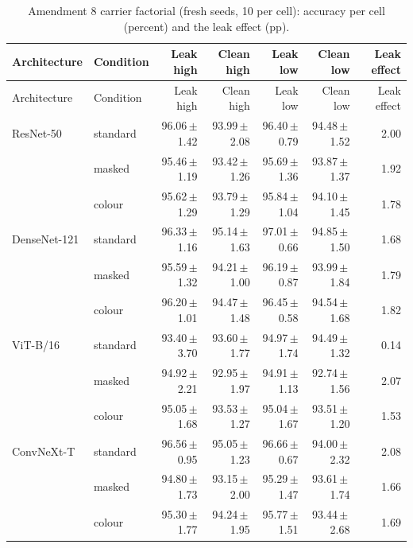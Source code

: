 {\scriptsize
\setlength{\tabcolsep}{3.5pt}
\begin{longtable}{llrrrrr}
\caption{Amendment 8 carrier factorial (fresh seeds, 10 per cell): accuracy per cell (percent) and the leak effect (pp).}\label{r:tab:carrier}\\
\toprule
Architecture & Condition & Leak high & Clean high & Leak low & Clean low & Leak effect \\
\midrule
\endfirsthead
\toprule
Architecture & Condition & Leak high & Clean high & Leak low & Clean low & Leak effect \\
\midrule
\endhead
\bottomrule
\endfoot
ResNet-50 & standard & 96.06\,$\pm$\,1.42 & 93.99\,$\pm$\,2.08 & 96.40\,$\pm$\,0.79 & 94.48\,$\pm$\,1.52 & 2.00 \\
 & masked & 95.46\,$\pm$\,1.19 & 93.42\,$\pm$\,1.26 & 95.69\,$\pm$\,1.36 & 93.87\,$\pm$\,1.37 & 1.92 \\
 & colour & 95.62\,$\pm$\,1.29 & 93.79\,$\pm$\,1.29 & 95.84\,$\pm$\,1.04 & 94.10\,$\pm$\,1.45 & 1.78 \\
DenseNet-121 & standard & 96.33\,$\pm$\,1.16 & 95.14\,$\pm$\,1.63 & 97.01\,$\pm$\,0.66 & 94.85\,$\pm$\,1.50 & 1.68 \\
 & masked & 95.59\,$\pm$\,1.32 & 94.21\,$\pm$\,1.00 & 96.19\,$\pm$\,0.87 & 93.99\,$\pm$\,1.84 & 1.79 \\
 & colour & 96.20\,$\pm$\,1.01 & 94.47\,$\pm$\,1.48 & 96.45\,$\pm$\,0.58 & 94.54\,$\pm$\,1.68 & 1.82 \\
ViT-B/16 & standard & 93.40\,$\pm$\,3.70 & 93.60\,$\pm$\,1.77 & 94.97\,$\pm$\,1.74 & 94.49\,$\pm$\,1.32 & 0.14 \\
 & masked & 94.92\,$\pm$\,2.21 & 92.95\,$\pm$\,1.97 & 94.91\,$\pm$\,1.13 & 92.74\,$\pm$\,1.56 & 2.07 \\
 & colour & 95.05\,$\pm$\,1.68 & 93.53\,$\pm$\,1.27 & 95.04\,$\pm$\,1.67 & 93.51\,$\pm$\,1.20 & 1.53 \\
ConvNeXt-T & standard & 96.56\,$\pm$\,0.95 & 95.05\,$\pm$\,1.23 & 96.66\,$\pm$\,0.67 & 94.00\,$\pm$\,2.32 & 2.08 \\
 & masked & 94.80\,$\pm$\,1.73 & 93.15\,$\pm$\,2.00 & 95.29\,$\pm$\,1.47 & 93.61\,$\pm$\,1.74 & 1.66 \\
 & colour & 95.30\,$\pm$\,1.77 & 94.24\,$\pm$\,1.95 & 95.77\,$\pm$\,1.51 & 93.44\,$\pm$\,2.68 & 1.69 \\
\end{longtable}
}
